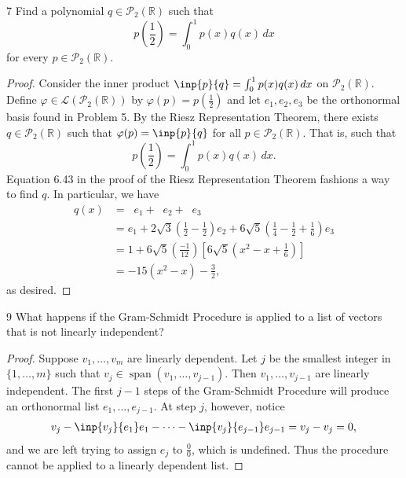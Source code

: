 \documentclass{extarticle}
\newenvironment{problem}[1]{\begin{prob*}{#1}{}}{\end{prob*}}
\newcommand{\R}{\mathbb{R}}
\newcommand{\poly}{\mathcal{P}}
\DeclareMathOperator{\Span}{span}
\newcommand{\Hom}{\mathcal{L}}
\newcommand\widebar[1]{\mathop{\overline{#1}}}
\begin{document}
\begin{problem}{7}
Find a polynomial $q\in\poly_2(\R)$ such that
\begin{equation*}
p\left(\frac{1}{2}\right)=\int_0^1p(x)q(x)\,dx
\end{equation*}
for every $p\in\poly_2(\R)$.  
\end{problem}
\begin{proof}
Consider the inner product $\inp{p}{q} = \int_0^1p(x)q(x)\,dx$ on $\poly_2(\R)$.  Define $\varphi\in\Hom(\poly_2(\R))$ by $\varphi(p) = p\left(\frac{1}{2}\right)$ and let $e_1, e_2, e_3$ be the orthonormal basis found in Problem 5.  By the Riesz Representation Theorem, there exists $q\in\poly_2(\R)$ such that $\varphi(p) = \inp{p}{q}$ for all $p\in\poly_2(\R)$.  That is, such that 
\begin{equation*}
p\left(\frac{1}{2}\right) = \int_0^1p(x)q(x)\,dx.
\end{equation*}
Equation 6.43 in the proof of the Riesz Representation Theorem fashions a way to find $q$.  In particular, we have 
\begin{align*}
q(x) &= \widebar{\varphi(e_1)}e_1 + \widebar{\varphi(e_2)}e_2 + \widebar{\varphi(e_3)}e_3\\
&= e_1 + 2\sqrt{3}\left(\frac{1}{2} - \frac{1}{2}\right)e_2 + 6\sqrt{5}\left(\frac{1}{4} - \frac{1}{2} + \frac{1}{6}\right)e_3\\
&= 1 + 6\sqrt{5}\left(\frac{-1}{12}\right)\left[6\sqrt{5}\left(x^2 - x + \frac{1}{6}\right)\right]\\
&= -15(x^2 - x) - \frac{3}{2},
\end{align*}
as desired.
\end{proof}

\begin{problem}{9}
What happens if the Gram-Schmidt Procedure is applied to a list of vectors that is not linearly independent?
\end{problem}
\begin{proof}
Suppose $v_1,\dots,v_m$ are linearly dependent.  Let $j$ be the smallest integer in $\{1,\dots, m\}$ such that $v_j \in \Span(v_1,\dots, v_{j - 1})$.  Then $v_1,\dots, v_{j - 1}$ are linearly independent.  The first $j - 1$ steps of the Gram-Schmidt Procedure will produce an orthonormal list $e_1,\dots, e_{j - 1}$.  At step $j$, however, notice
\begin{align*}
v_j - \inp{v_j}{e_1}e_1 - \dots - \inp{v_j}{e_{j - 1}}e_{j-1} = v_j - v_j = 0,
\end{align*}
and we are left trying to assign $e_j$ to $\frac{0}{0}$, which is undefined.  Thus the procedure cannot be applied to a linearly dependent list.
\end{proof}
\end{document}

